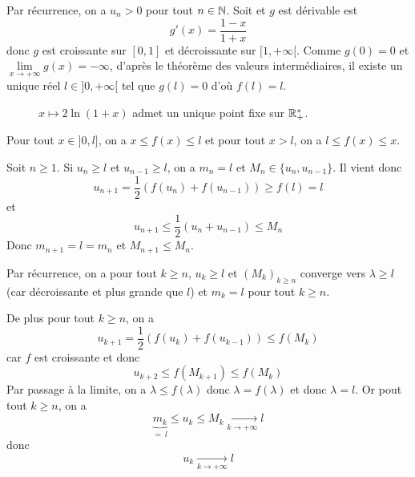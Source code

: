 \begin{solution}
	Par récurrence, on a $u_{n}>0$ pour tout $n\in\mathbb{N}$.
	Soit 
	et 
	$g$ est dérivable est 
	$$g'(x)=\frac{1-x}{1+x}$$
	donc $g$ est croissante sur $[0,1]$ et décroissante sur $[1,+\infty[$. Comme $g(0)=0$ et $\lim\limits_{x\to+\infty}g(x)=-\infty$, d'après le théorème des valeurs intermédiaires, il existe un unique réel $l\in]0,+\infty[$ tel que $g(l)=0$ d'où $f(l)=l$.

	\begin{figure}
		\centering
		\caption{$x\mapsto 2\ln(1+x)$ admet un unique point fixe sur $\mathbb{R}_{+}^{*}$.}
	\end{figure}

	Pour tout $x\in]0,l]$, on a $x\leqslant f(x)\leqslant l$ et pour tout $x>l$, on a $l\leqslant f(x)\leqslant x$.

	Soit $n\geqslant1$. Si $u_{n}\geqslant l$ et $u_{n-1}\geqslant l$, on a $m_{n}=l$ et $M_{n}\in\{u_{n},u_{n-1}\}$. Il vient donc 
	$$u_{n+1}=\frac{1}{2}(f(u_{n})+f(u_{n-1}))\geqslant f(l)=l$$
	et 
	$$u_{n+1}\leqslant\frac{1}{2}(u_{n}+u_{n-1})\leqslant M_{n}$$
	Donc $m_{n+1}=l=m_{n}$ et $M_{n+1}\leqslant M_{n}$.

	Par récurrence, on a pour tout $k\geqslant n$, $u_{k}\geqslant l$ et $(M_{k})_{k\geqslant n}$ converge vers $\lambda\geqslant l$ (car décroissante et plus grande que $l$) et $m_{k}=l$ pour tout $k\geqslant n$.

	De plus pour tout $k\geqslant n$, on a 
	$$u_{k+1}=\frac{1}{2}(f(u_{k})+f(u_{k-1}))\leqslant f(M_{k})$$
	car $f$ est croissante et donc 
	$$u_{k+2}\leqslant f(M_{k+1})\leqslant f(M_{k})$$
	Par passage à la limite, on a $\lambda\leqslant f(\lambda)$ donc $\lambda=f(\lambda)$ et donc $\lambda=l$. Or pout tout $k\geqslant n$, on a 
	$$\underbrace{m_{k}}_{=~l}\leqslant u_{k}\leqslant M_{k}\xrightarrow[k\to+\infty]{}l$$
	donc 
	$$\boxed{u_{k}\xrightarrow[k\to+\infty]{}l}$$


\end{solution}
